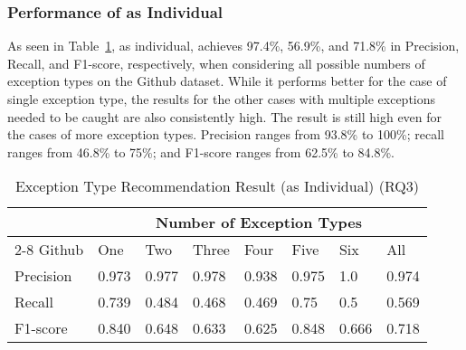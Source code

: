 \subsubsection{Performance of {\xtype} as Individual}
As seen in Table~\ref{tab:xtype-1}, as individual, {\xtype} achieves
97.4\%, 56.9\%, and 71.8\% in Precision, Recall, and F1-score,
respectively, when considering all possible numbers of exception
types on the Github dataset.
%
While it performs better for the case of single exception type, the
results for the other cases with multiple exceptions needed to be
caught are also consistently high. The result is still high even for
the cases of more exception types. Precision ranges from 93.8\% to
100\%; recall ranges from 46.8\% to 75\%; and F1-score ranges from
62.5\% to 84.8\%.


\begin{table}[htpb]
  \caption{Exception Type Recommendation Result (\xtype as Individual) (RQ3)}
  \vspace{-12pt}
  \small
	\begin{center}
		\renewcommand{\arraystretch}{1}
		\begin{tabular}{| p{1.2cm}<{\centering} | p{0.6cm}<{\centering} | p{0.6cm}<{\centering}| p{0.6cm}<{\centering} | p{0.6cm}<{\centering} | p{0.6cm}<{\centering} | p{0.6cm}<{\centering} | p{0.6cm}<{\centering} |}
		  \hline
			\multirow{2}{*}{} & \multicolumn{7}{c|}{Number of Exception Types} \\
			\cline{2-8}
			Github & One & Two & Three & Four & Five & Six & All\\
			\hline
			Precision &  0.973 & 0.977 & 0.978 & 0.938 & 0.975 & 1.0 & 0.974\\
			\hline
			Recall &  0.739 & 0.484 & 0.468 & 0.469 & 0.75 & 0.5 & 0.569\\
			\hline
			F1-score &  0.840 & 0.648 & 0.633 & 0.625 & 0.848 & 0.666 & 0.718\\
			\hline
		\end{tabular}
		\label{tab:xtype-1}
	\end{center}
\end{table}
